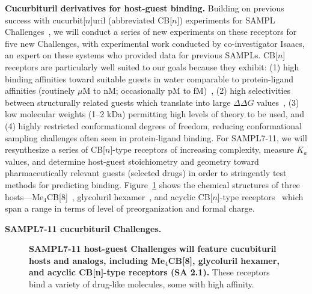 \documentclass[11pt]{article}
\begin{document}
\textbf{Cucurbituril derivatives for host-guest binding.} 
Building on previous success with cucurbit[$n$]uril (abbreviated CB[$n$]) experiments for SAMPL Challenges~\cite{ma_acyclic_2012-2, cao_absolute_2014, she_glycoluril-derived_2016}, we will conduct a series of new experiments on these receptors for five new Challenges,
 with experimental work conducted by co-investigator Isaacs, an expert on these systems who provided data for previous SAMPLs.
CB[$n$] receptors are particularly well suited to our goals because they exhibit: (1) high binding affinities toward suitable guests in water comparable to protein-ligand affinities (routinely $\mu$M to nM; occasionally pM to fM)~\cite{cao_attomolar_2014, liu_cucurbituril_2005, mock_structure_1986, assaf_cucurbiturils:_2015, moghaddam_new_2011, shetty_can_2015, biedermann_release_2012}, (2) high selectivities between structurally related guests which translate into large $\Delta \Delta G$ values~\cite{isaacs_stimuli_2014}, (3) low molecular weights (1--2 kDa) permitting high levels of theory to be used, and (4) highly restricted conformational degrees of freedom, reducing conformational sampling challenges often seen in protein-ligand binding.
For SAMPL7-11, we will resynthesize a series of CB[$n$]-type receptors of increasing complexity, measure $K_a$ values, and determine host-guest stoichiometry and geometry toward pharmaceutically relevant guests (selected drugs) in order to stringently test methods for predicting binding.  
Figure~\ref{figure:CB} shows the chemical structures of three hosts---Me$_4$CB[8]~\cite{vinciguerra_synthesis_2015}, glycoluril hexamer~\cite{lucas_templated_2011}, and acyclic CB[$n$]-type receptors~\cite{ma_acyclic_2012, ma_acyclic_2012-1, zhang_acyclic_2014, gilberg_acyclic_2015, sigwalt_acyclic_2016, zhang_acyclic_2014-1} which span a range in terms of level of preorganization and formal charge.


\textbf{SAMPL7-11 cucurbituril Challenges.} 


\begin{figure}[h]
\begin{centering}

\end{centering}

\caption{
\label{figure:CB} \footnotesize {\bf SAMPL7-11 host-guest Challenges will feature cucubituril hosts and analogs, including Me$_4$CB[8], glycoluril hexamer, and acyclic CB[n]-type receptors (SA 2.1).} 
These receptors bind a variety of drug-like molecules, some with high affinity.
\vspace{-0.2in}
}
\end{figure}
\end{document}
